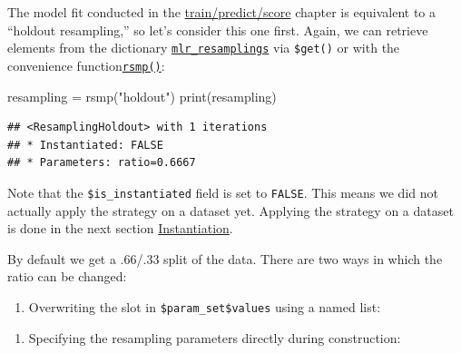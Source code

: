 \documentclass[
]{scrbook}
\newenvironment{Shaded}{\begin{snugshade}}{\end{snugshade}}
\newcommand{\AttributeTok}[1]{\textcolor[rgb]{0.77,0.63,0.00}{#1}}
\newcommand{\FloatTok}[1]{\textcolor[rgb]{0.00,0.00,0.81}{#1}}
\newcommand{\FunctionTok}[1]{\textcolor[rgb]{0.00,0.00,0.00}{#1}}
\newcommand{\NormalTok}[1]{#1}
\newcommand{\OtherTok}[1]{\textcolor[rgb]{0.56,0.35,0.01}{#1}}
\newcommand{\SpecialCharTok}[1]{\textcolor[rgb]{0.00,0.00,0.00}{#1}}
\newcommand{\StringTok}[1]{\textcolor[rgb]{0.31,0.60,0.02}{#1}}
\providecommand{\tightlist}{%
  \setlength{\itemsep}{0pt}\setlength{\parskip}{0pt}}
\renewenvironment{Shaded} {\begin{snugshade}\small} {\end{snugshade}}
\begin{document}
The model fit conducted in the \protect\hyperlink{train-predict}{train/predict/score} chapter is equivalent to a ``holdout resampling,'' so let's consider this one first.
Again, we can retrieve elements from the dictionary \href{https://mlr3.mlr-org.com/reference/mlr_resamplings.html}{\texttt{mlr\_resamplings}} via \texttt{\$get()} or with the convenience function\href{https://mlr3.mlr-org.com/reference/mlr_sugar.html}{\texttt{rsmp()}}:

\begin{Shaded}
\begin{Highlighting}[]
\NormalTok{resampling }\OtherTok{=} \FunctionTok{rsmp}\NormalTok{(}\StringTok{"holdout"}\NormalTok{)}
\FunctionTok{print}\NormalTok{(resampling)}
\end{Highlighting}
\end{Shaded}

\begin{verbatim}
## <ResamplingHoldout> with 1 iterations
## * Instantiated: FALSE
## * Parameters: ratio=0.6667
\end{verbatim}

Note that the \texttt{\$is\_instantiated} field is set to \texttt{FALSE}.
This means we did not actually apply the strategy on a dataset yet.
Applying the strategy on a dataset is done in the next section \protect\hyperlink{resampling-inst}{Instantiation}.

By default we get a .66/.33 split of the data.
There are two ways in which the ratio can be changed:

\begin{enumerate}
\def\labelenumi{\arabic{enumi}.}
\tightlist
\item
  Overwriting the slot in \texttt{\$param\_set\$values} using a named list:
\end{enumerate}

\begin{Shaded}
\end{Shaded}

\begin{enumerate}
\def\labelenumi{\arabic{enumi}.}
\setcounter{enumi}{1}
\tightlist
\item
  Specifying the resampling parameters directly during construction:
\end{enumerate}
\end{document}
